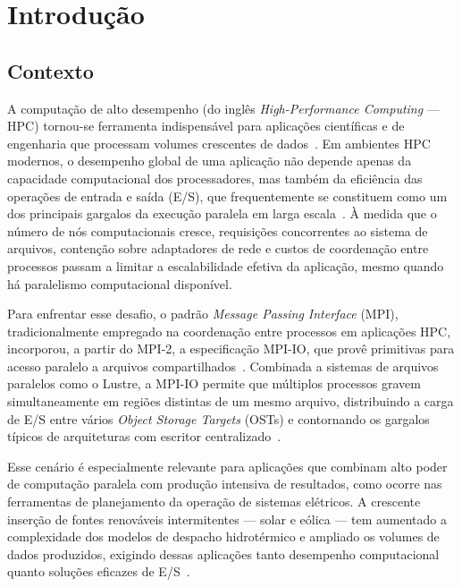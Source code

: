\chapter{Introdução}
\label{cap:introducao}


\section{Contexto}

A computação de alto desempenho (do inglês \textit{High-Performance
Computing} --- HPC) tornou-se ferramenta indispensável para
aplicações científicas e de engenharia que processam volumes
crescentes de dados~\cite{Kang:20}. Em ambientes HPC modernos, o
desempenho global de uma aplicação não depende apenas da capacidade
computacional dos processadores, mas também da eficiência das
operações de entrada e saída (E/S), que frequentemente se
constituem como um dos principais gargalos da execução paralela em
larga escala~\cite{Luu:15, Xie:20}. À medida que o número de nós
computacionais cresce, requisições concorrentes ao sistema de
arquivos, contenção sobre adaptadores de rede e custos de
coordenação entre processos passam a limitar a escalabilidade
efetiva da aplicação, mesmo quando há paralelismo computacional
disponível.

Para enfrentar esse desafio, o padrão \textit{Message Passing
Interface} (MPI), tradicionalmente empregado na coordenação entre
processos em aplicações HPC, incorporou, a partir do MPI-2, a
especificação MPI-IO, que provê primitivas para acesso paralelo a
arquivos compartilhados~\cite{mpi50Cite}. Combinada a sistemas de
arquivos paralelos como o Lustre, a MPI-IO permite que
múltiplos processos gravem simultaneamente em regiões distintas de
um mesmo arquivo, distribuindo a carga de E/S entre vários
\textit{Object Storage Targets} (OSTs) e contornando os gargalos
típicos de arquiteturas com escritor centralizado~\cite{LustreManual}.

Esse cenário é especialmente relevante para aplicações que combinam
alto poder de computação paralela com produção intensiva de
resultados, como ocorre nas ferramentas de planejamento da operação
de sistemas elétricos. A crescente inserção de fontes renováveis
intermitentes --- solar e eólica --- tem aumentado a complexidade
dos modelos de despacho hidrotérmico e ampliado os volumes de
dados produzidos, exigindo dessas aplicações tanto desempenho
computacional quanto soluções eficazes de
E/S~\cite{Ajc:10, Ssr:19}.

